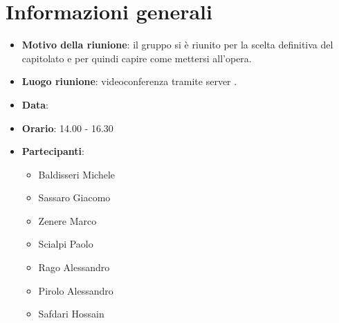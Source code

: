 \section{Informazioni generali}
\begin{itemize}
\item \textbf{Motivo della riunione}: il gruppo si è riunito per la scelta definitiva del capitolato e per quindi capire come mettersi all'opera.
\item \textbf{Luogo riunione}: videoconferenza tramite server .
\item \textbf{Data}: \Data{}
\item \textbf{Orario}: 14.00 - 16.30
\item \textbf{Partecipanti}:
	\begin{itemize}
	\item Baldisseri Michele
	\item Sassaro Giacomo
	\item Zenere Marco
	\item Scialpi Paolo
	\item Rago Alessandro
	\item Pirolo Alessandro
	\item Safdari Hossain
	\end{itemize}
\end{itemize}
\newpage
